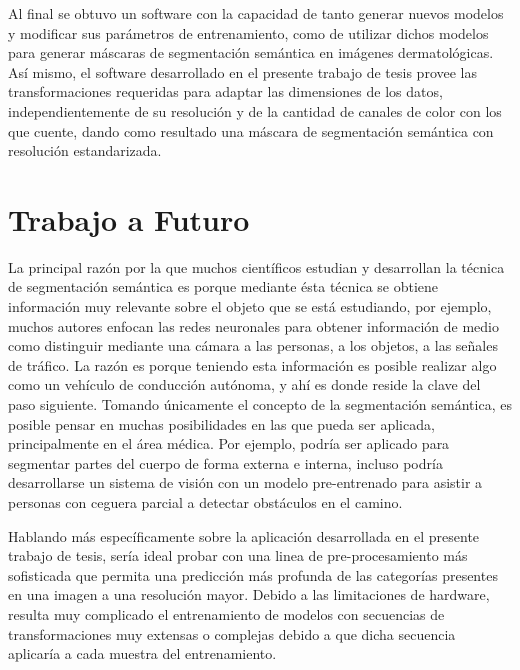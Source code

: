Al final se obtuvo un software con la capacidad de tanto generar nuevos modelos y modificar sus parámetros de entrenamiento, como de utilizar dichos modelos para generar máscaras de segmentación semántica en imágenes dermatológicas. Así mismo, el software desarrollado en el presente trabajo de tesis provee las transformaciones requeridas para adaptar las dimensiones de los datos, independientemente de su resolución y de la cantidad de canales de color con los que cuente, dando como resultado una máscara de segmentación semántica con resolución estandarizada.

\section{Trabajo a Futuro}
La principal razón por la que muchos científicos estudian y desarrollan la técnica de segmentación semántica es porque mediante ésta técnica se obtiene información muy relevante sobre el objeto que se está estudiando, por ejemplo, muchos autores enfocan las redes neuronales para obtener información de medio como distinguir mediante una cámara a las personas, a los objetos, a las señales de tráfico. La razón es porque teniendo esta información es posible realizar algo como un vehículo de conducción autónoma, y ahí es donde reside la clave del paso siguiente. Tomando únicamente el concepto de la segmentación semántica, es posible pensar en muchas posibilidades en las que pueda ser aplicada, principalmente en el área médica. Por ejemplo, podría ser aplicado para segmentar partes del cuerpo de forma externa e interna, incluso podría desarrollarse un sistema de visión con un modelo pre-entrenado para asistir a personas con ceguera parcial a detectar obstáculos en el camino.


Hablando más específicamente sobre la aplicación desarrollada en el presente trabajo de tesis, sería ideal probar con una linea de pre-procesamiento más sofisticada que permita una predicción más profunda de las categorías presentes en una imagen a una resolución mayor. Debido a las limitaciones de hardware, resulta muy complicado el entrenamiento de modelos con secuencias de transformaciones muy extensas o complejas debido a que dicha secuencia aplicaría a cada muestra del entrenamiento. 

\nocite{*}